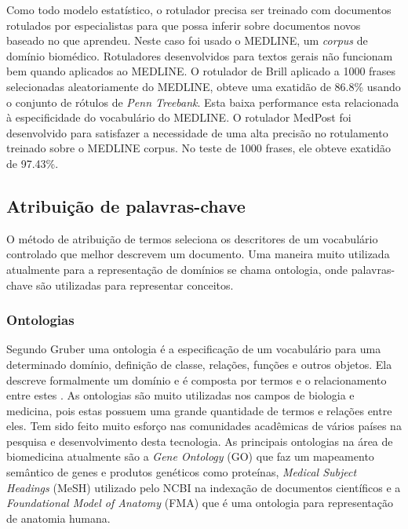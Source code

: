 Como todo modelo estatístico, o rotulador precisa ser treinado com documentos rotulados por especialistas para que possa inferir sobre documentos novos baseado no que aprendeu. Neste caso foi usado o MEDLINE, um \emph{corpus} de domínio biomédico. Rotuladores desenvolvidos para textos gerais não funcionam bem quando aplicados ao MEDLINE. O rotulador de Brill \cite{Brill1992} aplicado a 1000 frases selecionadas aleatoriamente do MEDLINE, obteve uma exatidão de 86.8\% usando o conjunto de rótulos de \emph{Penn Treebank}. Esta baixa performance esta relacionada à especificidade do vocabulário do MEDLINE. O rotulador MedPost \cite{Smith2004} foi desenvolvido para satisfazer a necessidade de uma alta precisão no rotulamento treinado sobre o MEDLINE corpus. No teste de 1000 frases, ele obteve exatidão de 97.43\%.

\subsection{Atribuição de palavras-chave}
O método de atribuição de termos seleciona os descritores de um vocabulário controlado que melhor descrevem um documento. Uma maneira muito utilizada atualmente para a representação de domínios se chama ontologia, onde palavras-chave são utilizadas para representar conceitos.

\subsubsection{Ontologias}

 Segundo Gruber \cite{Gruber1993} uma ontologia é a especificação de um vocabulário para uma determinado domínio, definição de classe, relações, funções e outros objetos. Ela descreve formalmente um domínio e é composta por termos e o relacionamento entre estes \cite{Antoniou2004}. As ontologias são muito utilizadas nos campos de biologia e medicina, pois estas possuem uma grande quantidade de termos e relações entre eles. Tem sido feito muito esforço nas comunidades acadêmicas de vários países na pesquisa e desenvolvimento desta tecnologia. As principais ontologias na área de biomedicina atualmente são a \emph{Gene Ontology} (GO) \cite{GO2000} que faz um mapeamento semântico de genes e produtos genéticos como proteínas, \emph{Medical Subject Headings} (MeSH) \cite{MESH2000} utilizado pelo NCBI na indexação de documentos científicos e a \emph{Foundational Model of Anatomy}  (FMA) \cite{FMA2003} que é uma ontologia para representação de anatomia humana.

